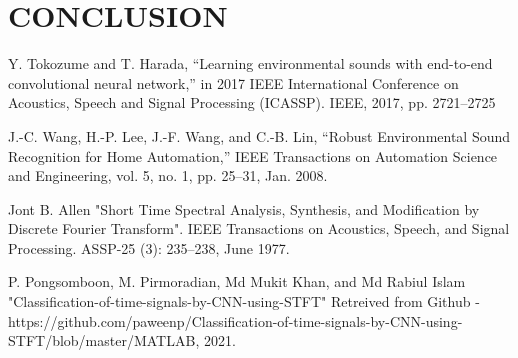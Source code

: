 \documentclass[conference]{IEEEtran}
\begin{document}
\section{CONCLUSION}



\begin{thebibliography}{00}
 Y. Tokozume and T. Harada, “Learning environmental sounds with end-to-end convolutional neural network,” in 2017 IEEE International Conference on Acoustics, Speech and Signal Processing (ICASSP). IEEE, 2017, pp. 2721–2725 

 J.-C. Wang, H.-P. Lee, J.-F. Wang, and C.-B. Lin, “Robust Environmental Sound Recognition for Home Automation,” IEEE Transactions on Automation Science and Engineering, vol. 5, no. 1, pp. 25–31, Jan. 2008.

 Jont B. Allen "Short Time Spectral Analysis, Synthesis, and Modification by Discrete Fourier Transform". IEEE Transactions on Acoustics, Speech, and Signal Processing. ASSP-25 (3): 235–238, June 1977.

 P. Pongsomboon, M. Pirmoradian, Md Mukit Khan, and Md Rabiul Islam "Classification-of-time-signals-by-CNN-using-STFT" Retreived from Github - https://github.com/paweenp/Classification-of-time-signals-by-CNN-using-STFT/blob/master/MATLAB, 2021.




\end{thebibliography}
\end{document}
